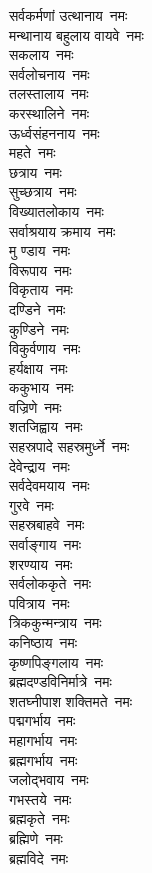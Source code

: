 \begin{multicols}{2}
\begin{flushleft}
सर्वकर्मणां उत्थानाय~नमः\\
मन्थानाय बहुलाय वायवे~नमः\\
सकलाय~नमः\\
सर्वलोचनाय~नमः\hfill{}\\
तलस्तालाय~नमः\\
करस्थालिने~नमः\\
ऊर्ध्वसंहननाय~नमः\\
महते~नमः\\
छत्राय~नमः\\
सुच्छत्राय~नमः\\
विख्यातलोकाय~नमः\\
सर्वाश्रयाय क्रमाय~नमः\\
मु ण्डाय~नमः\\
विरूपाय~नमः\hfill{}\\
विकृताय~नमः\\
दण्डिने~नमः\\
कुण्डिने~नमः\\
विकुर्वणाय~नमः\\
हर्यक्षाय~नमः\\
ककुभाय~नमः\\
वज्रिणे~नमः\\
शतजिह्वाय~नमः\\
सहस्रपादे सहस्रमुर्ध्ने~नमः\\
देवेन्द्राय~नमः\hfill{}\\
सर्वदेवमयाय~नमः\\
गुरवे~नमः\\
सहस्रबाहवे~नमः\\
सर्वाङ्गाय~नमः\\
शरण्याय~नमः\\
सर्वलोककृते~नमः\\
पवित्राय~नमः\\
त्रिककुन्मन्त्राय~नमः\\
कनिष्ठाय~नमः\\
कृष्णपिङ्गलाय~नमः\hfill{}\\
ब्रह्मदण्डविनिर्मात्रे~नमः\\
शतघ्नीपाश शक्तिमते~नमः\\
पद्मगर्भाय~नमः\\
महागर्भाय~नमः\\
ब्रह्मगर्भाय~नमः\\
जलोद्भवाय~नमः\\
गभस्तये~नमः\\
ब्रह्मकृते~नमः\\
ब्रह्मिणे~नमः\\
ब्रह्मविदे~नमः\hfill{}\\

\end{flushleft}
\end{multicols}
